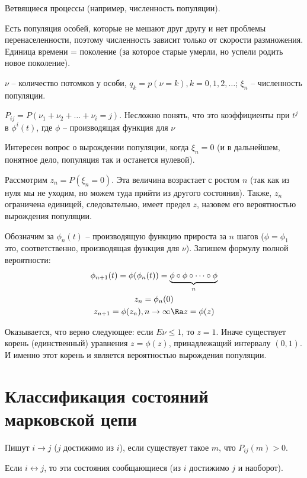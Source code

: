 \begin{exmp}
Ветвящиеся процессы (например, численность популяции).

Есть популяция особей, которые не мешают друг другу и нет проблемы перенаселенности, поэтому численность зависит только от скорости размножения.
Единица времени = поколение (за которое старые умерли, но успели родить новое поколение).

$\nu$ -- количество потомков у особи, $q_k = p(\nu = k), k = 0, 1, 2, \dots$;
$\xi_n$ -- численность популяции.

$P_{ij} = P(\nu_1 + \nu_2 + \dots + \nu_i = j)$. Несложно понять, что это коэффициенты при $t^j$ в $\phi^i(t)$, где $\phi$ -- производящая функция для $\nu$

Интересен вопрос о вырождении популяции, когда $\xi_n = 0$ (и в дальнейшем, понятное дело, популяция так и останется нулевой).

Рассмотрим $z_n = P(\xi_n = 0)$. Эта величина возрастает с ростом $n$ (так как из нуля мы не уходим, но можем туда прийти из другого состояния).
Также, $z_n$ ограничена единицей, следовательно, имеет предел $z$, назовем его вероятностью вырождения популяции.

Обозначим за $\phi_n(t)$ -- производящую функцию прироста за $n$ шагов ($\phi = \phi_1$ это, соответственно, производящая функция для $\nu$).
Запишем формулу полной вероятности: 
\begin{gather*}
\phi_{n+1}(t) = \phi(\phi_n(t)) = \underbrace{\phi \circ \phi \circ \dots \circ \phi}_{n} \\
z_n = \phi_n(0) \\
z_{n+1} = \phi(z_n), n \to \infty \Ra z = \phi(z)
\end{gather*}

Оказывается, что верно следующее: если $E \nu \leq 1$, то $z = 1$. Иначе существует корень (единственный) уравнения $z = \phi(z)$, принадлежащий интервалу $(0, 1)$.
И именно этот корень и является вероятностью вырождения популяции.
\end{exmp}

\section{Классификация состояний марковской цепи}
\begin{Def}
    Пишут $i \to j$ ($j$ достижимо из $i$), если существует такое $m$, что $P_{ij}(m) > 0$. 

    Если $i \leftrightarrow j$, то эти состояния сообщающиеся (из $i$ достижимо $j$ и наоборот).
\end{Def}

